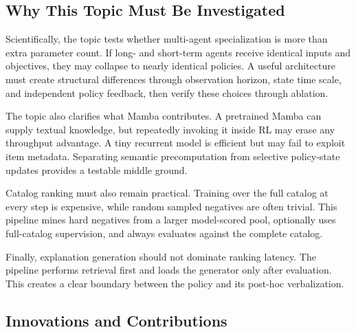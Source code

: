 \documentclass[11pt,a4paper]{article}
\begin{document}
\subsection{Why This Topic Must Be Investigated}

Scientifically, the topic tests whether multi-agent specialization is more than extra parameter count. If long- and short-term agents receive identical inputs and objectives, they may collapse to nearly identical policies. A useful architecture must create structural differences through observation horizon, state time scale, and independent policy feedback, then verify these choices through ablation.

The topic also clarifies what Mamba contributes. A pretrained Mamba can supply textual knowledge, but repeatedly invoking it inside RL may erase any throughput advantage. A tiny recurrent model is efficient but may fail to exploit item metadata. Separating semantic precomputation from selective policy-state updates provides a testable middle ground.

Catalog ranking must also remain practical. Training over the full catalog at
every step is expensive, while random sampled negatives are often trivial.
This pipeline mines hard negatives from a larger model-scored pool, optionally
uses full-catalog supervision, and always evaluates against the complete catalog.

Finally, explanation generation should not dominate ranking latency. The pipeline performs retrieval first and loads the generator only after evaluation. This creates a clear boundary between the policy and its post-hoc verbalization.

\subsection{Innovations and Contributions}
\end{document}
